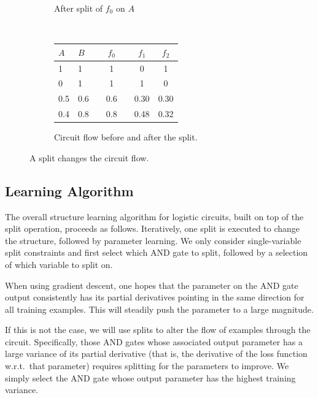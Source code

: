 \documentclass[letterpaper]{article} %
\begin{document}
\begin{figure}[t]
\begin{subfigure}[t]{0.22\textwidth}
{
	}
    	\caption{After split of $f_0$ on $A$} \label{fig: split:after}
	\end{subfigure}
	\\[5pt]
    \begin{subfigure}[t]{0.48\textwidth}
    \centering
    \begin{sc}
    {\fontsize{9}{9}\selectfont
            \begin{tabular}{ @{} ll  c  c c cc@{} }
             \toprule
              $A$ & $B$  & & $f_0$ & & $f_1$ & $f_2$ \\
             \midrule \midrule
             1 & 1 & &1 & & 0 & 1 \\
             0 & 1 & &1 & & 1 & 0 \\
             \midrule
    	0.5 & 0.6 & & 0.6 & & 0.30 & 0.30 \\
    	0.4 & 0.8 & & 0.8 & & 0.48 & 0.32 \\
              \bottomrule
           	\end{tabular}
    	}
              \end{sc}
    		\caption{Circuit flow before and after the split.}\label{table: flow change}
	\end{subfigure}
	\caption{A split changes the circuit flow.}\label{fig: split with flow change}
\end{figure}	




   
\subsection{Learning Algorithm}
The overall structure learning algorithm for logistic circuits, built on top of the split operation, proceeds as follows. Iteratively, one split is executed to change the structure, followed by parameter learning. 
We only consider single-variable split constraints and first select which AND gate to split, followed by a selection of which variable to split on.

When using gradient descent, one hopes that the parameter on the AND gate output consistently has its partial derivatives pointing in the same direction for all training examples. This will steadily push the parameter to a large magnitude. 

If this is not the case, we will use splits to alter the flow of examples through the circuit.
Specifically, those AND gates whose associated output parameter has a large variance of its partial derivative (that is, the derivative of the loss function w.r.t.~that parameter) requires splitting for the parameters to improve.  We simply select the AND gate whose output parameter has the highest training variance.
\end{document}

